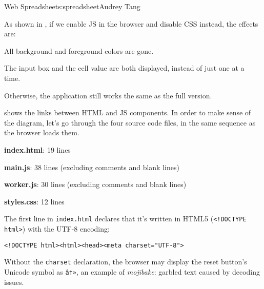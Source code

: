 \begin{aosachapter}{Web Spreadsheet}{s:spreadsheet}{Audrey Tang}

As shown in , if we enable JS in the
browser and disable CSS instead, the effects are:

\begin{aosaitemize}

\item
  All background and foreground colors are gone.
\item
  The input box and the cell value are both displayed, instead of just
  one at a time.
\item
  Otherwise, the application still works the same as the full version.
\end{aosaitemize}

\label{code-walkthrough}

 shows the links between HTML
and JS components. In order to make sense of the diagram, let's go
through the four source code files, in the same sequence as the browser
loads them.


\begin{aosaitemize}

\item
  \textbf{index.html}: 19 lines
\item
  \textbf{main.js}: 38 lines (excluding comments and blank lines)
\item
  \textbf{worker.js}: 30 lines (excluding comments and blank lines)
\item
  \textbf{styles.css}: 12 lines
\end{aosaitemize}

\label{html}

The first line in \texttt{index.html} declares that it's written in
HTML5 (\texttt{\textless{}!DOCTYPE html\textgreater{}}) with the UTF-8
encoding:

\begin{verbatim}
<!DOCTYPE html><html><head><meta charset="UTF-8">
\end{verbatim}

Without the \texttt{charset} declaration, the browser may display the
reset button's Unicode symbol as \texttt{â†»}, an example of
\emph{mojibake}: garbled text caused by decoding issues.


\end{aosachapter}
